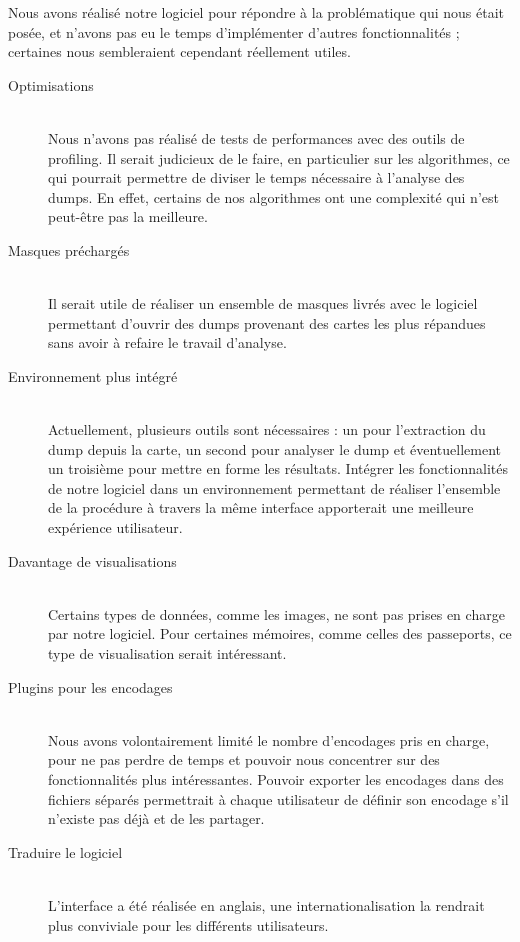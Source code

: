 Nous avons réalisé notre logiciel pour répondre à la problématique qui nous était posée, et n'avons pas eu le temps d'implémenter d'autres fonctionnalités ; certaines nous sembleraient cependant réellement utiles.

\begin{description}
  \item[Optimisations] \hfill \\
  Nous n'avons pas réalisé de tests de performances avec des outils de profiling.
  Il serait judicieux de le faire, en particulier sur les algorithmes, ce qui pourrait permettre de diviser le temps nécessaire à l'analyse des dumps. En effet, certains de nos algorithmes ont une complexité qui n'est peut-être pas la meilleure.

  \item[Masques préchargés] \hfill \\
  Il serait utile de réaliser un ensemble de masques livrés avec le logiciel permettant d'ouvrir des dumps provenant des cartes les plus répandues sans avoir à refaire le travail d'analyse.

  \item[Environnement plus intégré] \hfill \\
  Actuellement, plusieurs outils sont nécessaires : un pour l'extraction du dump depuis la carte, un second pour analyser le dump et éventuellement un troisième pour mettre en forme les résultats. Intégrer les fonctionnalités de notre logiciel dans un environnement permettant de réaliser l'ensemble de la procédure à travers la même interface apporterait une meilleure expérience utilisateur.

  \item[Davantage de visualisations] \hfill \\
  Certains types de données, comme les images, ne sont pas prises en charge par notre logiciel. Pour certaines mémoires, comme celles des passeports, ce type de visualisation serait intéressant.

  \item[Plugins pour les encodages] \hfill \\
  Nous avons volontairement limité le nombre d'encodages pris en charge, pour ne pas perdre de temps et pouvoir nous concentrer sur des fonctionnalités plus intéressantes. Pouvoir exporter les encodages dans des fichiers séparés permettrait à chaque utilisateur de définir son encodage s'il n'existe pas déjà et de les partager.

  \item[Traduire le logiciel] \hfill \\
  L'interface a été réalisée en anglais, une internationalisation la rendrait plus conviviale pour les différents utilisateurs.
\end{description}
